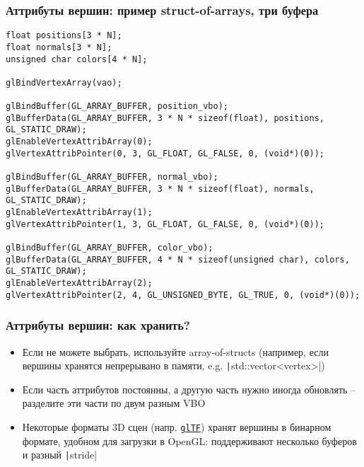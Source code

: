 \documentclass[10pt]{beamer}
\begin{document}
\begin{frame}[fragile]
\frametitle{Аттрибуты вершин: пример struct-of-arrays, три буфера}
\begin{verbatim}
float positions[3 * N];
float normals[3 * N];
unsigned char colors[4 * N];

glBindVertexArray(vao);

glBindBuffer(GL_ARRAY_BUFFER, position_vbo);
glBufferData(GL_ARRAY_BUFFER, 3 * N * sizeof(float), positions, GL_STATIC_DRAW);
glEnableVertexAttribArray(0);
glVertexAttribPointer(0, 3, GL_FLOAT, GL_FALSE, 0, (void*)(0));

glBindBuffer(GL_ARRAY_BUFFER, normal_vbo);
glBufferData(GL_ARRAY_BUFFER, 3 * N * sizeof(float), normals, GL_STATIC_DRAW);
glEnableVertexAttribArray(1);
glVertexAttribPointer(1, 3, GL_FLOAT, GL_FALSE, 0, (void*)(0));

glBindBuffer(GL_ARRAY_BUFFER, color_vbo);
glBufferData(GL_ARRAY_BUFFER, 4 * N * sizeof(unsigned char), colors, GL_STATIC_DRAW);
glEnableVertexAttribArray(2);
glVertexAttribPointer(2, 4, GL_UNSIGNED_BYTE, GL_TRUE, 0, (void*)(0));
\end{verbatim}
\begin{center}
\end{center}
\end{frame}

\begin{frame}[fragile]
\frametitle{Аттрибуты вершин: как хранить?}
\begin{itemize}
\item Если не можете выбрать, используйте array-of-structs (например, если вершины хранятся непрерывано в памяти, e.g. \texttt|std::vector<vertex>|)
\pause
\item Если часть аттрибутов постоянны, а другую часть нужно иногда обновлять -- разделите эти части по двум разным VBO
\pause
\item Некоторые форматы 3D сцен (напр. \href{https://registry.khronos.org/glTF/specs/2.0/glTF-2.0.html}{\texttt{glTF}}) хранят вершины в бинарном формате, удобном для загрузки в OpenGL: поддерживают несколько буферов и разный \texttt|stride|
\end{itemize}
\end{frame}
\end{document}

